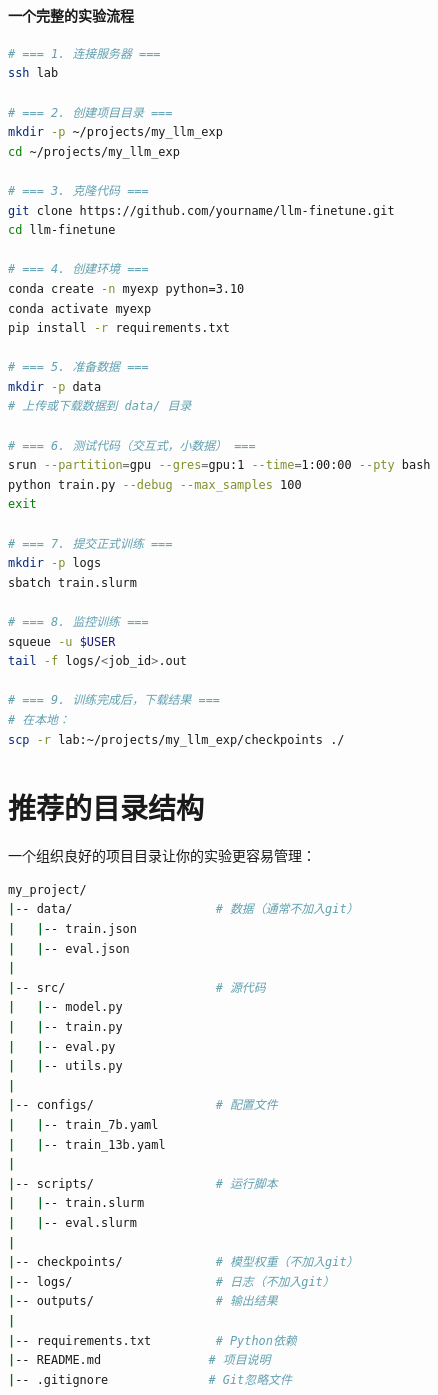 \paragraph{一个完整的实验流程}\mbox{}\par\nopagebreak

\begin{lstlisting}[language=bash, caption=从零开始的完整实验流程]
# === 1. 连接服务器 ===
ssh lab

# === 2. 创建项目目录 ===
mkdir -p ~/projects/my_llm_exp
cd ~/projects/my_llm_exp

# === 3. 克隆代码 ===
git clone https://github.com/yourname/llm-finetune.git
cd llm-finetune

# === 4. 创建环境 ===
conda create -n myexp python=3.10
conda activate myexp
pip install -r requirements.txt

# === 5. 准备数据 ===
mkdir -p data
# 上传或下载数据到 data/ 目录

# === 6. 测试代码（交互式，小数据） ===
srun --partition=gpu --gres=gpu:1 --time=1:00:00 --pty bash
python train.py --debug --max_samples 100
exit

# === 7. 提交正式训练 ===
mkdir -p logs
sbatch train.slurm

# === 8. 监控训练 ===
squeue -u $USER
tail -f logs/<job_id>.out

# === 9. 训练完成后，下载结果 ===
# 在本地：
scp -r lab:~/projects/my_llm_exp/checkpoints ./
\end{lstlisting}

\section*{推荐的目录结构}

一个组织良好的项目目录让你的实验更容易管理：

\begin{lstlisting}[language=bash, caption=推荐的项目目录结构]
my_project/
|-- data/                    # 数据（通常不加入git）
|   |-- train.json
|   |-- eval.json
|
|-- src/                     # 源代码
|   |-- model.py
|   |-- train.py
|   |-- eval.py
|   |-- utils.py
|
|-- configs/                 # 配置文件
|   |-- train_7b.yaml
|   |-- train_13b.yaml
|
|-- scripts/                 # 运行脚本
|   |-- train.slurm
|   |-- eval.slurm
|
|-- checkpoints/             # 模型权重（不加入git）
|-- logs/                    # 日志（不加入git）
|-- outputs/                 # 输出结果
|
|-- requirements.txt         # Python依赖
|-- README.md               # 项目说明
|-- .gitignore              # Git忽略文件
\end{lstlisting}

